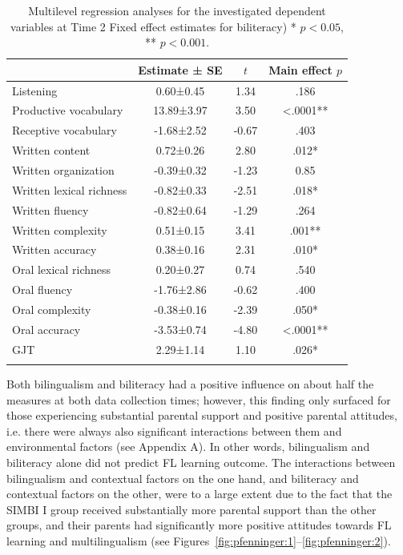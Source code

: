 \documentclass[output=paper,modfonts,nonflat,newtxmath]{langsci/langscibook}
\begin{document}
\begin{table}
	\caption{\label{tab:pfenninger:9} Multilevel regression analyses for the investigated dependent variables at Time 2 Fixed effect estimates for biliteracy) * $p <0.05$, ** $p <0.001$.}
	\begin{tabular}{lS[table-format=-1.3,parse-numbers=false]S[table-format=-1.2]S[table-format=<1.4]}
		\lsptoprule
		& {Estimate ± SE} & {$t$}  & {Main effect $p$}\\\midrule
		Listening  & 0.60±0.45 & 1.34 & .186\\
		Productive vocabulary & 13.89±3.97 & 3.50 & <.0001**\\
		Receptive vocabulary & -1.68±2.52 & -0.67 & .403\\
		Written content & 0.72±0.26 & 2.80 & .012*\\
		Written organization & -0.39±0.32 & -1.23 & 0.85\\
		Written lexical richness & -0.82±0.33 & -2.51 & .018*\\
		Written fluency & -0.82±0.64 & -1.29 & .264\\
		Written complexity & 0.51±0.15 & 3.41 & .001**\\
		Written accuracy & 0.38±0.16 & 2.31 & .010*\\
		Oral lexical richness & 0.20±0.27 & 0.74 & .540\\
		Oral fluency & -1.76±2.86 & -0.62 & .400\\
		Oral complexity & -0.38±0.16 & -2.39 & .050*\\
		Oral accuracy & -3.53±0.74 & -4.80 & <.0001**\\
		GJT & 2.29±1.14 & 1.10 & .026*\\
		\lspbottomrule
	\end{tabular}
\end{table}

Both bilingualism and biliteracy had a positive influence on about half the measures at both data collection times; however, this finding only surfaced for those experiencing substantial parental support and positive parental attitudes, i.e. there were always also significant interactions between them and environmental factors (see Appendix A). In other words, bilingualism and biliteracy alone did not predict FL learning outcome. The interactions between bilingualism and contextual factors on the one hand, and biliteracy and contextual factors on the other, were to a large extent due to the fact that the SIMBI I group received substantially more parental support than the other groups, and their parents had significantly more positive attitudes towards FL learning and multilingualism (see Figures~\ref{fig:pfenninger:1}--\ref{fig:pfenninger:2}).\largerpage[-1]%
\end{document}
